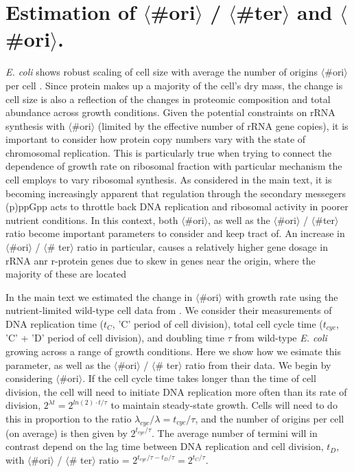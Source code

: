 \section{Estimation of $\langle$\#ori$\rangle$ / $\langle$\#ter$\rangle$ and $\langle$\#ori$\rangle$.}

\textit{E. coli} shows robust scaling of cell size with average the number of
origins $\langle$\#ori$\rangle$ per cell \citep{si2017}. Since protein makes up
a  majority of the cell's dry mass, the change is cell size is also a reflection
of the changes in proteomic composition and total abundance across growth
conditions. Given the potential constraints on rRNA synthesis with
$\langle$\#ori$\rangle$ (limited by the effective number of rRNA gene copies),
it is important to consider how protein copy numbers vary with the state of
chromosomal replication. This is particularly true  when trying to connect the
dependence of growth rate on ribosomal fraction with  particular mechanism the
cell employs to vary ribosomal synthesis.  As considered in the main text, it is
becoming increasingly apparent that regulation through the  secondary messegers
(p)ppGpp acts to throttle back DNA replication and ribosomal activity in poorer
nutrient conditions.  In this context, both $\langle$\#ori$\rangle$, as well as
the $\langle$\#ori$\rangle$ / $\langle$\#ter$\rangle$ ratio become important
parameters to consider and keep tract of. An increase in $\langle$\#ori$\rangle$
/ $\langle$\# ter$\rangle$ ratio  in particular, causes a relatively higher gene
dosage in rRNA anr r-protein genes due to skew in genes near the origin, where
the majority of these are located

In the main text we estimated the change in $\langle$\#ori$\rangle$ with growth
rate using the nutrient-limited wild-type cell data from \cite{si2017}. We
consider their measurements of DNA replication time ($t_{C}$, 'C' period of
cell division), total cell cycle time ($t_{cyc}$, 'C' + 'D' period of cell
division), and doubling time $\tau$ from wild-type \textit{E. coli} growing
across a range of growth conditions. Here we show how we  esimate this
parameter, as well as the $\langle$\#ori$\rangle$ / $\langle$\# ter$\rangle$
ratio from their data.  We begin by considering $\langle$\#ori$\rangle$. If the
cell cycle time takes longer  than the time of cell division, the cell will need
to initiate DNA replication  more often than its rate of division, $2^{\lambda
t} = 2^{ln(2) \cdot t/ \tau}$ to maintain steady-state growth. Cells will need
to do this in proportion to the ratio $\lambda_{cyc} / \lambda =  t_{cyc}/\tau$,
and the number of origins per cell (on average) is then given by $2^{t_{cyc}/
\tau}$.   The average number of termini will in contrast depend on the lag time
between  DNA replication and cell division, $t_{D}$, with
$\langle$\#ori$\rangle$ / $\langle$\# ter$\rangle$ ratio = $2^{t_{cyc}/ \tau -
t_{D}/ \tau} =  2^{t_{C}/ \tau}$.

